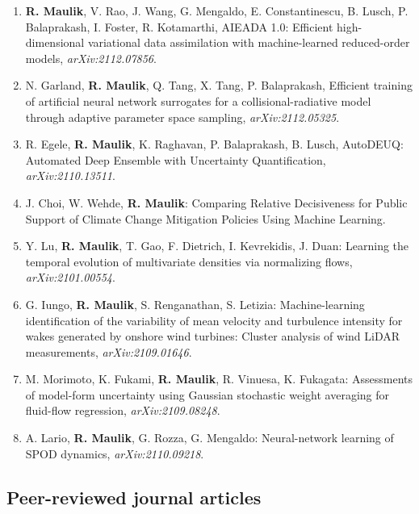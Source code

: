 \documentclass[letterpaper]{article}
\begin{document}
\begin{enumerate}

\item \textbf{R. Maulik}, V. Rao, J. Wang, G. Mengaldo, E. Constantinescu, B. Lusch, P. Balaprakash, I. Foster, R. Kotamarthi, AIEADA 1.0: Efficient high-dimensional variational data assimilation with machine-learned reduced-order models, {\it arXiv:2112.07856}.

\item N. Garland, \textbf{R. Maulik}, Q. Tang, X. Tang, P. Balaprakash, Efficient training of artificial neural network surrogates for a collisional-radiative model through adaptive parameter space sampling, {\it arXiv:2112.05325}.

\item R. Egele, \textbf{R. Maulik}, K. Raghavan, P. Balaprakash, B. Lusch, AutoDEUQ: Automated Deep Ensemble with Uncertainty Quantification, {\it arXiv:2110.13511}.

\item J. Choi, W. Wehde, \textbf{R. Maulik}: Comparing Relative Decisiveness for Public Support of Climate Change Mitigation Policies Using Machine Learning.

\item Y. Lu, \textbf{R. Maulik}, T. Gao, F. Dietrich, I. Kevrekidis, J. Duan: Learning the temporal evolution of multivariate densities via normalizing flows, {\it arXiv:2101.00554}.

\item G. Iungo, \textbf{R. Maulik}, S. Renganathan, S. Letizia: Machine-learning identification of the variability of mean velocity and turbulence intensity for wakes generated by onshore wind turbines: Cluster analysis of wind LiDAR measurements, {\it arXiv:2109.01646}.

\item M. Morimoto, K. Fukami, \textbf{R. Maulik}, R. Vinuesa, K. Fukagata: Assessments of model-form uncertainty using Gaussian stochastic weight averaging for fluid-flow regression, {\it arXiv:2109.08248}.

\item A. Lario, \textbf{R. Maulik}, G. Rozza, G. Mengaldo: Neural-network learning of SPOD dynamics, {\it arXiv:2110.09218}.

\end{enumerate}


\subsection*{Peer-reviewed journal articles}
\end{document}
